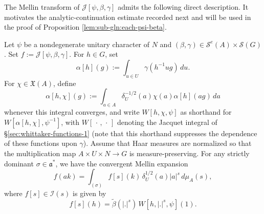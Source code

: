 The Mellin transform of $\mathcal{J}[\psi,\beta,\gamma]$ admits the following direct description.  It motivates the analytic-continuation estimate recorded next and will be used in the proof of Proposition \ref{lem:sub-gln:each-psi-beta}.
\begin{lemma}\label{lem:mellin-expansion-cal-J}
  Let $\psi$ be a nondegenerate unitary character of $N$ and $(\beta,\gamma) \in \mathcal{S}^e(A) \times \mathcal{S}(G)$.  Set $f := \mathcal{J}[\psi,\beta,\gamma]$.  For $h \in G$, set
  \begin{equation*}
    \alpha[h](g) := \int_{u \in U} \gamma(h^{-1} u g)\,d u.
  \end{equation*}
  For $\chi \in \mathfrak{X}(A)$, define
  \begin{equation*}
    \alpha[h,\chi](g)
    :=
    \int_{a \in A} \delta_U^{-1/2}(a)\chi(a)\alpha[h](a g)\,d a
  \end{equation*}
  whenever this integral converges, and write $W[h,\chi,\psi]$ as shorthand for $W[\alpha[h,\chi],\psi^{-1}]$, with $W[\,\cdot\,,\,\cdot\,]$ denoting the Jacquet integral of \S\ref{sec:whittaker-functions-1} (note that this shorthand suppresses the dependence of these functions upon $\gamma$).  Assume that Haar measures are normalized so that the multiplication map $A \times U \times N \rightarrow G$ is measure-preserving.  For any strictly dominant $\sigma \in \mathfrak{a}^*$, we have the convergent Mellin expansion
  \begin{equation}\label{eq:mellin-expansion-cal-J}
    f(a k)
    =
    \int_{(\sigma)}
    f[s](k)\,
    \delta_U^{1/2}(a) |a|^s
    \, d \mu_A(s),
  \end{equation}
  where $f[s] \in \mathcal{I}(s)$ is given by
  \begin{equation}\label{eq:mellin-component-cal-J}
    f[s](h) = \tilde{\beta}(|.|^s)\,W[h,|.|^s,\psi](1).
  \end{equation}
\end{lemma}
